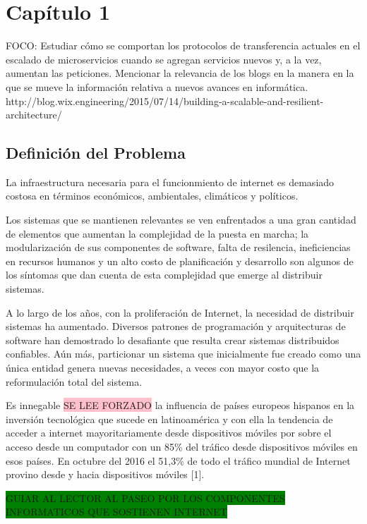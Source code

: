 \chapter{Capítulo 1}

FOCO: Estudiar cómo se comportan los protocolos de transferencia actuales en el escalado de microservicios cuando se agregan servicios nuevos y, a la vez, aumentan las peticiones.
Mencionar la relevancia de los blogs en la manera en la que se mueve la información relativa a nuevos avances en informática.
http://blog.wix.engineering/2015/07/14/building-a-scalable-and-resilient-architecture/

\section{Definición del Problema}

La infraestructura necesaria para el funcionmiento de internet es demasiado costosa en términos económicos, ambientales, climáticos y políticos.

Los sistemas que se mantienen relevantes se ven enfrentados a una gran cantidad de elementos que aumentan la complejidad de la puesta en marcha; la modularización de sus componentes de software, falta de resilencia, ineficiencias en recursos humanos y un alto costo de planificación y desarrollo son algunos de los síntomas que dan cuenta de esta complejidad que emerge al distribuir sistemas.

A lo largo de los años, con la proliferación de Internet, la necesidad de distribuir sistemas ha aumentado. Diversos patrones de programación y arquitecturas de software han demostrado lo desafiante que resulta crear sistemas distribuidos confiables. Aún más, particionar un sistema que inicialmente fue creado como una única entidad genera nuevas necesidades, a veces con mayor costo que la reformulación total del sistema.

Es innegable \colorbox{pink}{SE LEE FORZADO} la influencia de países europeos hispanos en la inversión tecnológica que sucede en latinoamérica y con ella la tendencia de acceder a internet mayoritariamente desde dispositivos móviles por sobre el acceso desde un computador con un 85\% del tráfico desde dispositivos móviles en esos países. En octubre del 2016 el 51,3\% de todo el tráfico mundial de Internet provino desde y hacia dispositivos móviles [1].

\colorbox{green}{GUIAR AL LECTOR AL PASEO POR LOS COMPONENTES INFORMATICOS QUE SOSTIENEN INTERNET}


